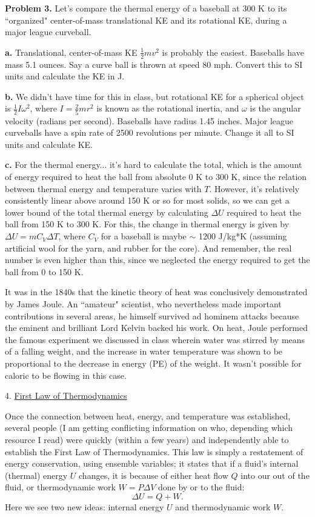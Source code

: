 \documentclass[12pt]{article}
\begin{document}
\textbf{Problem 3.} Let's compare the thermal energy of a baseball at 300 K to its ``organized" center-of-mass translational KE and its rotational KE, during a major league curveball.

\textbf{a.} Translational, center-of-mass KE $\frac{1}{2}mv^2$ is probably the easiest. Baseballs have mass 5.1 ounces. Say a curve ball is thrown at speed 80 mph. Convert this to SI units and calculate the KE in J.

\textbf{b.} We didn't have time for this in class, but rotational KE for a spherical object is $\frac{1}{2}I\omega^2$, where $I=\frac{2}{5}mr^2$ is known as the rotational inertia, and $\omega$ is the angular velocity (radians per second). Baseballs have radius 1.45 inches. Major league curveballs have a spin rate of 2500 revolutions per minute. Change it all to SI units and calculate KE.

\textbf{c.} For the thermal energy... it's hard to calculate the total, which is the amount of energy required to heat the ball from absolute 0 K to 300 K, since the relation between thermal energy and temperature varies with $T$. However, it's relatively consistently linear above around 150 K or so for most solids, so we can get a lower bound of the total thermal energy by calculating $\Delta U$ required to heat the ball from 150 K to 300 K. For this, the change in thermal energy is given by $\Delta U=mC_V\Delta T$, where $C_V$ for a baseball is maybe $\sim$ 1200 J/kg*K (assuming artificial wool for the yarn, and rubber for the core). And remember, the real number is even higher than this, since we neglected the energy required to get the ball from 0 to 150 K. 


It was in the 1840s that the kinetic theory of heat was conclusively demonstrated by James Joule. An ``amateur" scientist, who nevertheless made important contributions in several areas, he himself survived ad hominem attacks because the eminent and brilliant Lord Kelvin backed his work. On heat, Joule performed the famous experiment we discussed in class wherein water was stirred by means of a falling weight, and the increase in water temperature was shown to be proportional to the decrease in energy (PE) of the weight. It wasn't possible for caloric to be flowing in this case. 

\newpage

4. \underline{First Law of Thermodynamics}

Once the connection between heat, energy, and temperature was established, several people (I am getting conflicting information on who, depending which resource I read) were quickly (within a few years) and independently able to establish the First Law of Thermodynamics. This law is simply a restatement of energy conservation, using ensemble variables; it states that if a fluid's internal (thermal) energy $U$ changes, it is because of either heat flow $Q$ into our out of the fluid, or thermodynamic work $W=P\Delta V$ done by or to the fluid: 
\begin{equation}
    \Delta U = Q + W.
\end{equation}
Here we see two new ideas: internal energy $U$ and thermodynamic work $W$.
\end{document}
